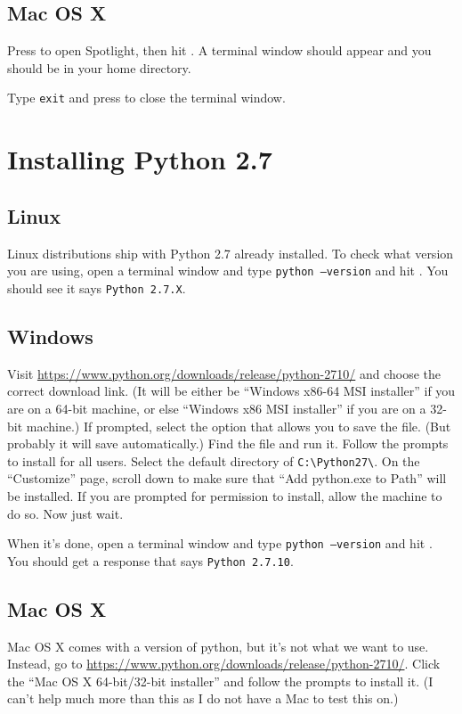 \documentclass[11pt]{article} %
\newcommand{\code}[1]{\colorbox{codegray}{\texttt{#1}}}
\newcommand{\keyboard}[1]{{\sc{#1}}}
\begin{document}
\subsection{Mac OS X}

Press \keyboard{\cmd-space} to open Spotlight, then hit \keyboard{Enter}.
A terminal window should appear and you should be in your home directory.

Type \code{exit} and press \keyboard{Enter} to close the terminal window.

\section{Installing Python 2.7}
\subsection{Linux}
Linux distributions ship with Python 2.7 already installed.
To check what version you are using, open a terminal window and type \code{python --version} and hit \keyboard{Enter}.
You should see it says \code{Python 2.7.X}.

\subsection{Windows}
Visit \href{https://www.python.org/downloads/release/python-2710/}{https://www.python.org/downloads/release/python-2710/} and choose the correct download link.
(It will be either be ``Windows x86-64 MSI installer'' if you are on a 64-bit machine, or else ``Windows x86 MSI installer'' if you are on a 32-bit machine.)
If prompted, select the option that allows you to save the file.
(But probably it will save automatically.)
Find the file and run it.
Follow the prompts to install for all users.
Select the default directory of \code{C:\textbackslash Python27\textbackslash}.
On the ``Customize'' page, scroll down to make sure that ``Add python.exe to Path'' will be installed.
If you are prompted for permission to install, allow the machine to do so.
Now just wait.

When it's done, open a terminal window and type \code{python --version} and hit \keyboard{Enter}.
You should get a response that says \code{Python 2.7.10}.

\subsection{Mac OS X}
Mac OS X comes with a version of python, but it's not what we want to use.
Instead, go to \href{https://www.python.org/downloads/release/python-2710/}{https://www.python.org/downloads/release/python-2710/}.
Click the ``Mac OS X 64-bit/32-bit installer'' and follow the prompts to install it.
(I can't help much more than this as I do not have a Mac to test this on.)
\end{document}
